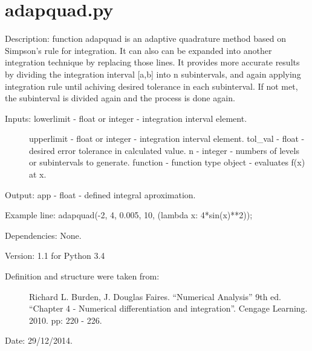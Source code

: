 \documentclass[letterpaper,10pt,oneside]{sphinxmanual}
\theoremstyle{plain}%
\theoremstyle{definition}%
\theoremstyle{remark}%
\begin{document}
\section{adapquad.py}
\label{code:module-adapquad}\label{code:adapquad-py}
Description: function adapquad is an adaptive quadrature method based on 
Simpson's rule for integration. It can also can be expanded into another 
integration technique by replacing those lines. It provides more accurate 
results by dividing the integration interval {[}a,b{]} into n subintervals, 
and again applying integration rule until achiving desired tolerance in 
each subinterval. If not met, the subinterval is divided again and the 
process is done again.
\begin{description}
\item[{Inputs: lowerlimit - float or integer - integration interval element.}] \leavevmode
upperlimit - float or integer - integration interval element.
tol\_val - float - desired error tolerance in calculated value.
n - integer - numbers of levels or subintervals to generate.
function - function type object - evaluates f(x) at x.

\end{description}

Output: app - float - defined integral aproximation.

Example line: adapquad(-2, 4, 0.005, 10, (lambda x: 4*sin(x)**2));

Dependencies: None.

Version: 1.1 for Python 3.4
\begin{description}
\item[{Definition and structure were taken from:}] \leavevmode
Richard L. Burden, J. Douglas Faires. ``Numerical Analysis'' 9th ed.
``Chapter 4 - Numerical differentiation and integration''. 
Cengage Learning. 2010. pp: 220 - 226.

\end{description}




Date: 29/12/2014.
\end{document}
